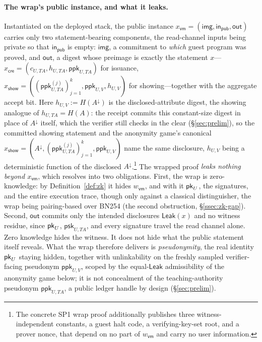 \paragraph{The wrap's public instance, and what it leaks.}
Instantiated on the deployed stack, the public instance $x_{\mathsf{vm}}=(\mathsf{img},\mathsf{in}_{\mathsf{pub}},\mathsf{out})$ carries only two statement-bearing components, the read-channel inputs being private so that $\mathsf{in}_{\mathsf{pub}}$ is empty: $\mathsf{img}$, a commitment to \emph{which} guest program was proved, and $\mathsf{out}$, a digest whose preimage is exactly the statement $x$---$x_{\mathsf{cre}}=(c_{U,TA},h_{U,TA},\mathsf{ppk}_{U,TA})$ for issuance, $x_{\mathsf{show}}=((\mathsf{ppk}_{U,TA}^{(j)})_{j=1}^{k},\mathsf{ppk}_{U,V},h_{U,V})$ for showing---together with the aggregate accept bit. Here $h_{U,V}:=H(A^\downarrow)$ is the disclosed-attribute digest, the showing analogue of $h_{U,TA}=H(A)$: the receipt commits this constant-size digest in place of $A^\downarrow$ itself, which the verifier still checks in the clear (\S\ref{sec:prelim}), so the committed showing statement and the anonymity game's canonical $x_{\mathsf{show}}=(A^\downarrow,(\mathsf{ppk}_{U,TA}^{(j)})_{j=1}^{k},\mathsf{ppk}_{U,V})$ name the same disclosure, $h_{U,V}$ being a deterministic function of the disclosed $A^\downarrow$.\footnote{The concrete SP1 wrap proof additionally publishes three witness-independent constants, a guest halt code, a verifying-key-set root, and a prover nonce, that depend on no part of $w_{\mathsf{vm}}$ and carry no user information.} The wrapped proof \emph{leaks nothing beyond $x_{\mathsf{vm}}$}, which resolves into two obligations. First, the wrap is zero-knowledge: by Definition~\ref{def:zk} it hides $w_{\mathsf{vm}}$, and with it $\mathsf{pk}_U$, the signatures, and the entire execution trace, though only against a classical distinguisher, the wrap being pairing-based over {BN254} (the second obstruction, \S\ref{ssec:zk-gap}). Second, $\mathsf{out}$ commits only the intended disclosures $\mathsf{Leak}(x)$ and no witness residue, since $\mathsf{pk}_U$, $\mathsf{psk}_{U,TA}$, and every signature travel the read channel alone. Zero knowledge hides the witness. It does not hide what the public statement itself reveals. What the wrap therefore delivers is \emph{pseudonymity}, the real identity $\mathsf{pk}_U$ staying hidden, together with unlinkability on the freshly sampled verifier-facing pseudonym $\mathsf{ppk}_{U,V}$, scoped by the equal-$\mathsf{Leak}$ admissibility of the anonymity game below; it is not concealment of the teaching-authority pseudonym $\mathsf{ppk}_{U,TA}$, a public ledger handle by design (\S\ref{sec:prelim}).

